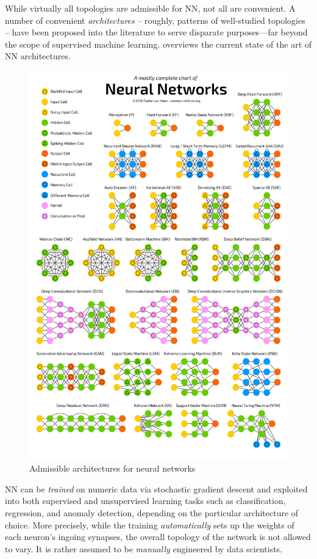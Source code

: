\documentclass[12pt,a4paper,openright,twoside]{book}
\begin{document}
While virtually all topologies are admissible for NN, not all are convenient.
%
A number of convenient \emph{architectures} -- roughly, patterns of well-studied topologies -- have been proposed into the literature \cite{VanVeenL2019} to serve disparate purposes---far beyond the scope of supervised machine learning.
%
 overviews the current state of the art of NN architectures.
%
\begin{figure}
    \centering
    \includegraphics[width=.8\linewidth]{figures/neural-network-architectures.png}
    \caption{Admissible architectures for neural networks \cite{VanVeenL2019}}
    \label{fig:nn-architectures}
\end{figure}

NN can be \emph{trained} on numeric data via stochastic gradient descent and exploited into both supervised and unsupervised learning tasks such as classification, regression, and anomaly detection, depending on the particular architecture of choice.
%
More precisely, while the training \emph{automatically} sets up the weights of each neuron's ingoing synapses, the overall topology of the network is not allowed to vary.
%
It is rather assumed to be \emph{manually} engineered by data scientists.
\end{document}
